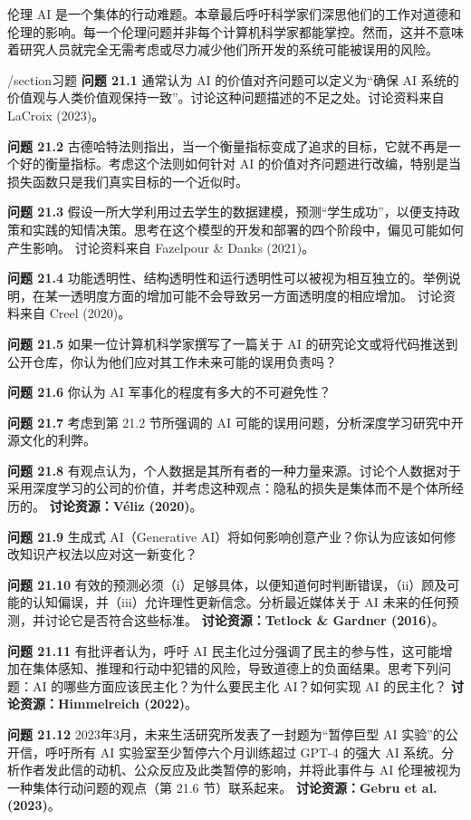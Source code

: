 伦理 AI 是一个集体的行动难题。本章最后呼吁科学家们深思他们的工作对道德和伦理的影响。每一个伦理问题并非每个计算机科学家都能掌控。然而，这并不意味着研究人员就完全无需考虑或尽力减少他们所开发的系统可能被误用的风险。

/section{习题}
\textbf{问题 21.1} 通常认为 AI 的价值对齐问题可以定义为“确保 AI 系统的价值观与人类价值观保持一致”。讨论这种问题描述的不足之处。讨论资料来自 LaCroix (2023)。

\textbf{问题 21.2} 古德哈特法则指出，当一个衡量指标变成了追求的目标，它就不再是一个好的衡量指标。考虑这个法则如何针对 AI 的价值对齐问题进行改编，特别是当损失函数只是我们真实目标的一个近似时。

\textbf{问题 21.3} 假设一所大学利用过去学生的数据建模，预测“学生成功”，以便支持政策和实践的知情决策。思考在这个模型的开发和部署的四个阶段中，偏见可能如何产生影响。 讨论资料来自 Fazelpour \& Danks (2021)。

\textbf{问题 21.4} 功能透明性、结构透明性和运行透明性可以被视为相互独立的。举例说明，在某一透明度方面的增加可能不会导致另一方面透明度的相应增加。 讨论资料来自 Creel (2020)。

\textbf{问题 21.5} 如果一位计算机科学家撰写了一篇关于 AI 的研究论文或将代码推送到公开仓库，你认为他们应对其工作未来可能的误用负责吗？

\textbf{问题 21.6} 你认为 AI 军事化的程度有多大的不可避免性？

\textbf{问题 21.7} 考虑到第 21.2 节所强调的 AI 可能的误用问题，分析深度学习研究中开源文化的利弊。

\textbf{问题 21.8} 有观点认为，个人数据是其所有者的一种力量来源。讨论个人数据对于采用深度学习的公司的价值，并考虑这种观点：隐私的损失是集体而不是个体所经历的。
\textbf{讨论资源：Véliz (2020)}。

\textbf{问题 21.9} 生成式 AI（Generative AI）将如何影响创意产业？你认为应该如何修改知识产权法以应对这一新变化？

\textbf{问题 21.10} 有效的预测必须（i）足够具体，以便知道何时判断错误，（ii）顾及可能的认知偏误，并（iii）允许理性更新信念。分析最近媒体关于 AI 未来的任何预测，并讨论它是否符合这些标准。
\textbf{讨论资源：Tetlock \& Gardner (2016)}。

\textbf{问题 21.11} 有批评者认为，呼吁 AI 民主化过分强调了民主的参与性，这可能增加在集体感知、推理和行动中犯错的风险，导致道德上的负面结果。思考下列问题：AI 的哪些方面应该民主化？为什么要民主化 AI？如何实现 AI 的民主化？
\textbf{讨论资源：Himmelreich (2022)}。

\textbf{问题 21.12} 2023年3月，未来生活研究所发表了一封题为“暂停巨型 AI 实验”的公开信，呼吁所有 AI 实验室至少暂停六个月训练超过 GPT-4 的强大 AI 系统。分析作者发此信的动机、公众反应及此类暂停的影响，并将此事件与 AI 伦理被视为一种集体行动问题的观点（第 21.6 节）联系起来。
\textbf{讨论资源：Gebru et al. (2023)}。

